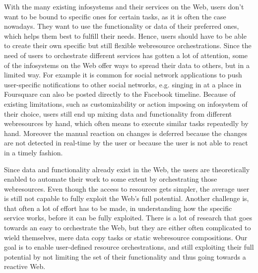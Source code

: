 With the many existing \textrm{\glspl{infosystem}} and their services on the Web, users don't want to be bound to specific ones for certain tasks, as it is often the case nowadays.
They want to use the functionality or data of their preferred ones, which helps them best to fulfill their needs.
Hence, users should have to be able to create their own specific but still flexible \textrm{\gls{webresource}} orchestrations.
Since the need of users to orchestrate different services has gotten a lot of attention, some of the \textrm{\glspl{infosystem}} on the Web offer ways to spread their data to others, but in a limited way.
For example it is common for social network applications to push user-specific notifications to other social networks, e.g. singing in at a place in \textrm{Foursquare} can also be posted directly to the \textrm{Facebook} timeline.
Because of existing limitations, such as customizability or action imposing on \textrm{\gls{infosystem}} of their choice, users still end up mixing data and functionality from different \textrm{\glspl{webresource}} by hand, which often means to execute similar tasks repeatedly by hand.
Moreover the manual reaction on changes is deferred because the changes are not detected in real-time by the user or because the user is not able to react in a timely fashion.

Since data and functionality already exist in the Web, the users are theoretically enabled to automate their work to some extent by orchestrating those \textrm{\glspl{webresource}}.
Even though the access to resources gets simpler, the average user is still not capable to fully exploit the Web's full potential.
Another challenge is, that often a lot of effort has to be made, in understanding how the specific service works, before it can be fully exploited.
There is a lot of research that goes towards an easy to orchestrate the Web, but they are either often complicated to wield themselves, mere data copy tasks or static \textrm{\gls{webresource}} compositions.
Our goal is to enable user-defined resource orchestrations, and still exploiting their full potential by not limiting the set of their functionality and thus going towards a reactive Web.

